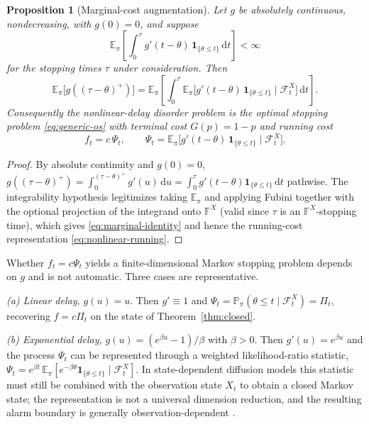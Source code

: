 \documentclass[pdflatex,sn-mathphys-num]{sn-jnl}
\theoremstyle{plain}
\newtheorem{proposition}[theorem]{Proposition}
\theoremstyle{definition}
\newcommand{\E}{\mathbb{E}}
\newcommand{\PR}{\mathbb{P}}
\newcommand{\Filt}{\mathbb{F}}
\newcommand{\Fx}{\mathcal{F}}
\newcommand{\ind}{\mathbf{1}}
\newcommand{\dd}{\,\mathrm{d}}
\newcommand{\post}{\Pi}
\begin{document}
\begin{proposition}[Marginal-cost augmentation]\label{prop:marginal}
Let $g$ be absolutely continuous, nondecreasing, with $g(0)=0$, and suppose
\[
  \E_\pi\!\left[\int_0^\tau g'(t-\theta)\,\ind_{\{\theta\le t\}}\dd t\right]<\infty
\]
for the stopping times $\tau$ under consideration. Then
\begin{equation}\label{eq:marginal-identity}
  \E_\pi\big[g((\tau-\theta)^+)\big]
   =\E_\pi\!\left[\int_0^\tau
     \E_\pi\big[g'(t-\theta)\,\ind_{\{\theta\le t\}}\mid\Fx^X_t\big]\dd t\right].
\end{equation}
Consequently the nonlinear-delay disorder problem is the optimal stopping problem
\eqref{eq:generic-os} with terminal cost $G(p)=1-p$ and running cost
\begin{equation}\label{eq:nonlinear-running}
  f_t=c\,\Psi_t,\qquad
  \Psi_t=\E_\pi\big[g'(t-\theta)\,\ind_{\{\theta\le t\}}\mid\Fx^X_t\big].
\end{equation}
\end{proposition}

\begin{proof}
By absolute continuity and $g(0)=0$,
$g((\tau-\theta)^+)=\int_0^{(\tau-\theta)^+}g'(u)\dd u
=\int_0^\tau g'(t-\theta)\ind_{\{\theta\le t\}}\dd t$ pathwise. The integrability
hypothesis legitimizes taking $\E_\pi$ and applying Fubini together with the
optional projection of the integrand onto $\Filt^X$ (valid since $\tau$ is an
$\Filt^X$-stopping time), which gives \eqref{eq:marginal-identity} and hence the
running-cost representation \eqref{eq:nonlinear-running}.
\end{proof}

Whether $f_t=c\Psi_t$ yields a finite-dimensional Markov stopping problem depends
on $g$ and is not automatic. Three cases are representative.

\emph{(a) Linear delay,} $g(u)=u$. Then $g'\equiv1$ and
$\Psi_t=\PR_\pi(\theta\le t\mid\Fx^X_t)=\post_t$, recovering $f=c\post_t$ on the
state of Theorem~\ref{thm:closed}.

\emph{(b) Exponential delay,} $g(u)=(e^{\beta u}-1)/\beta$ with $\beta>0$. Then
$g'(u)=e^{\beta u}$ and the process $\Psi_t$ can be represented through a weighted
likelihood-ratio statistic,
$\Psi_t=e^{\beta t}\,\E_\pi[e^{-\beta\theta}\ind_{\{\theta\le t\}}\mid\Fx^X_t]$.
In state-dependent diffusion models this statistic must still be combined with the
observation state $X_t$ to obtain a closed Markov state; the representation is not
a universal dimension reduction, and the resulting alarm boundary is generally
observation-dependent \citep{gapeev2013bayesian}.
\end{document}

